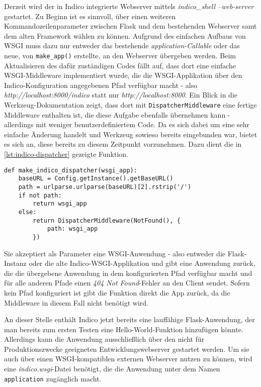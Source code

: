 Derzeit wird der in Indico integrierte Webserver mittels \emph{indico\_shell --web-server}
gestartet. Zu Beginn ist es sinnvoll, über einen weiteren Kommandozeilenparameter zwischen Flask und
dem bestehenden Webserver samt dem alten Framework wählen zu können. Aufgrund des einfachen Aufbaus
von WSGI muss dazu nur entweder das bestehende \emph{application-Callable} oder das neue, von
\lstinline{make_app()} erstellte, an den Webserver übergeben werden. Beim Aktualisieren des
dafür zuständigen Codes fällt auf, dass dort eine einfache WSGI-Middleware implementiert wurde, die
die WSGI-Applikation über den Indico-Konfiguration angegebenen Pfad verfügbar macht - also
\emph{http://localhost:8000/indico} statt nur \emph{http://localhost:8000}. Ein Blick
in die Werkzeug-Dokumentation zeigt, dass dort mit \lstinline{DispatcherMiddleware} eine fertige
Middleware enthalten ist, die diese Aufgabe ebenfalls übernehmen kann - allerdings mit weniger
benutzerdefiniertem Code. Da es sich dabei um eine sehr einfache Änderung handelt und Werkzeug
sowieso bereits eingebunden war, bietet es sich an, diese bereits zu diesem Zeitpunkt vorzunehmen.
Dazu dient die in \autoref{lst:indico-dispatcher} gezeigte Funktion.

\begin{lstlisting}[caption=Indico-WSGI-Dispatcher,label=lst:indico-dispatcher]
def make_indico_dispatcher(wsgi_app):
    baseURL = Config.getInstance().getBaseURL()
    path = urlparse.urlparse(baseURL)[2].rstrip('/')
    if not path:
        return wsgi_app
    else:
        return DispatcherMiddleware(NotFound(), {
            path: wsgi_app
        })
\end{lstlisting}

Sie akzeptiert als Parameter eine WSGI-Anwendung - also entweder die Flask-Instanz oder die alte
Indico-WSGI-Applikation und gibt eine Anwendung zurück, die die übergebene Anwendung in dem
konfigurierten Pfad verfügbar macht und für alle anderen Pfade einen \emph{404 Not Found}-Fehler an
den Client sendet. Sofern kein Pfad konfiguriert ist gibt die Funktion direkt die App zurück, da die
Middleware in diesem Fall nicht benötigt wird.

An dieser Stelle enthält Indico jetzt bereits eine lauffähige Flask-Anwendung, der man bereits zum
ersten Testen eine Hello-World-Funktion hinzufügen könnte. Allerdings kann die Anwendung
ausschließlich über den nicht für Produktionszwecke geeigneten Entwicklungswebserver gestartet
werden. Um sie auch über einen WSGI-kompatiblen externen Webserver nutzen zu können, wird eine
\emph{indico.wsgi}-Datei benötigt, die die Anwendung unter dem Namen \lstinline{application}
zugänglich macht.


